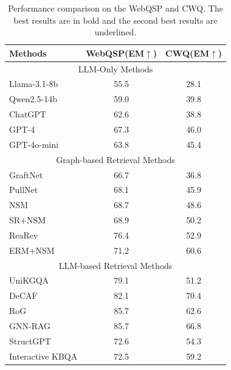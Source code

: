\documentclass[lettersize,journal]{IEEEtran}
\begin{document}
\begin{table}[h]
\centering
\caption{Performance comparison on the WebQSP and CWQ. The best results are in bold and the second best results are underlined.}
\begin{tabular}{ccc}
\toprule
\multicolumn{1}{l}{Methods}                &WebQSP(\textbf{EM}$\uparrow$)   &CWQ(\textbf{EM}$\uparrow$)    \\ \midrule
\multicolumn{3}{c}{LLM-Only Methods}                 \\ \midrule
\multicolumn{1}{l}{Llama-3.1-8b}             &55.5         &28.1             \\
\multicolumn{1}{l}{Qwen2.5-14b}            & 59.0          &39.8         \\
\multicolumn{1}{l}{ChatGPT}                  & 62.6          & 38.8        \\
\multicolumn{1}{l}{GPT-4}                  & 67.3          & 46.0        \\
\multicolumn{1}{l}{GPT-4o-mini}            & 63.8          & 45.4        \\ \midrule
\multicolumn{3}{c}{Graph-based Retrieval Methods} \\ \midrule
\multicolumn{1}{l}{GraftNet}               & 66.7      & 36.8    \\
\multicolumn{1}{l}{PullNet}                & 68.1      & 45.9    \\
\multicolumn{1}{l}{NSM}                & 68.7      & 48.6    \\
\multicolumn{1}{l}{SR+NSM}                 & 68.9      & 50.2    \\
\multicolumn{1}{l}{ReaRev}                 & 76.4      & 52.9    \\
\multicolumn{1}{l}{ERM+NSM}                & 71.2      & 60.6    \\ \midrule
\multicolumn{3}{c}{LLM-based Retrieval Methods} \\ \midrule
\multicolumn{1}{l}{UniKGQA}                & 79.1      & 51.2    \\
\multicolumn{1}{l}{DeCAF}                  & 82.1      & 70.4    \\
\multicolumn{1}{l}{RoG}                   & 85.7      & 62.6    \\
\multicolumn{1}{l}{GNN-RAG}                & 85.7      & 66.8    \\
\multicolumn{1}{l}{StructGPT}              & 72.6      & 54.3    \\
\multicolumn{1}{l}{Interactive KBQA}       & 72.5      & 59.2    \\

\end{tabular}
\end{table}
\end{document}
